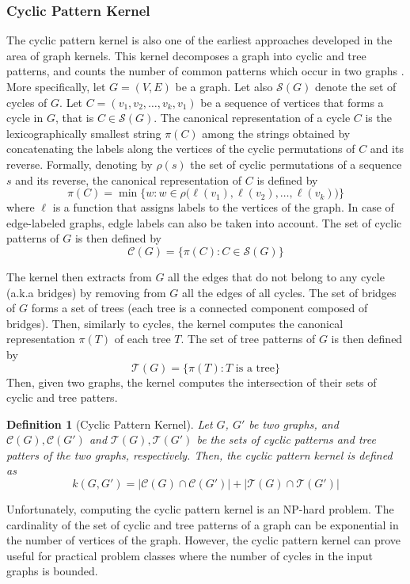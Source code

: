 \documentclass[twoside,11pt]{article}
\newtheorem{definition}{Definition}
\begin{document}
\subsubsection{Cyclic Pattern Kernel}
The cyclic pattern kernel is also one of the earliest approaches developed in the area of graph kernels.
This kernel decomposes a graph into cyclic and tree patterns, and counts the number of common patterns which occur in two graphs .
More specifically, let $G=(V,E)$ be a graph.
Let also $\mathcal{S}(G)$ denote the set of cycles of $G$.
Let $C = (v_1, v_2, \ldots, v_k, v_1)$ be a sequence of vertices that forms a cycle in $G$, that is $C \in \mathcal{S}(G)$.
The canonical representation of a cycle $C$ is the lexicographically smallest string $\pi(C)$ among the strings obtained by concatenating the labels along the vertices of the cyclic permutations of $C$ and its reverse.
Formally, denoting by $\rho(s)$ the set of cyclic permutations of a sequence $s$ and its reverse, the canonical representation of $C$ is defined by
\begin{equation}
  \pi(C) = \min\{ w : w \in \rho\big(\ell(v_1), \ell(v_2), \ldots, \ell(v_k) \big)\}
\end{equation}
where $\ell$ is a function that assigns labels to the vertices of the graph.
In case of edge-labeled graphs, edgle labels can also be taken into account.
The set of cyclic patterns of $G$ is then defined by
\begin{equation}
  \mathcal{C}(G) = \{ \pi(C) : C \in \mathcal{S}(G) \}
\end{equation}

The kernel then extracts from $G$ all the edges that do not belong to any cycle (a.k.a bridges) by removing from $G$ all the edges of all cycles.
The set of bridges of $G$ forms a set of trees (each tree is a connected component composed of bridges).
Then, similarly to cycles, the kernel computes the canonical representation $\pi(T)$ of each tree $T$.
The set of tree patterns of $G$ is then defined by
\begin{equation}
  \mathcal{T}(G) = \{ \pi(T) : T \text{ is a tree} \}
\end{equation}
Then, given two graphs, the kernel computes the intersection of their sets of cyclic and tree patters.
\begin{definition}[Cyclic Pattern Kernel]
  Let $G$, $G'$ be two graphs, and $\mathcal{C}(G), \mathcal{C}(G')$ and $\mathcal{T}(G), \mathcal{T}(G')$ be the sets of cyclic patterns and tree patters of the two graphs, respectively.
  Then, the cyclic pattern kernel is defined as
  \begin{equation}
    k(G,G') = |\mathcal{C}(G) \cap \mathcal{C}(G')| + |\mathcal{T}(G) \cap \mathcal{T}(G')|
  \end{equation}
\end{definition}
Unfortunately, computing the cyclic pattern kernel is an NP-hard problem.
The cardinality of the set of cyclic and tree patterns of a graph can be exponential in the number of vertices of the graph. 
However, the cyclic pattern kernel can prove useful for practical problem classes where the number of cycles in the input graphs is bounded.
\end{document}
